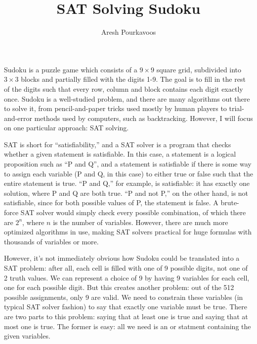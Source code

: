 \documentclass{article}
\begin{document}
\title{SAT Solving Sudoku}
\author{Aresh Pourkavoos}
\maketitle

Sudoku is a puzzle game which consists of a $9 \times 9$ square grid,
subdivided into $3 \times 3$ blocks
and partially filled with the digits 1-9.
The goal is to fill in the rest of the digits such that
every row, column and block contains each digit exactly once.
Sudoku is a well-studied problem,
and there are many algorithms out there to solve it,
from pencil-and-paper tricks used mostly by human players
to trial-and-error methods used by computers, such as backtracking.
However, I will focus on one particular approach: SAT solving.

SAT is short for ``satisfiability,''
and a SAT solver is a program that checks
whether a given statement is satisfiable.
In this case, a statement is a logical proposition
such as ``P and Q'',
and a statement is satisfiable
if there is some way to assign each variable
(P and Q, in this case) to either true or false
such that the entire statement is true.
``P and Q,'' for example, is satisfiable:
it has exactly one solution, where P and Q are both true.
``P and not P,'' on the other hand, is not satisfiable,
since for both possible values of P, the statement is false.
A brute-force SAT solver would simply check every possible combination,
of which there are $2^n$, where $n$ is the number of variables.
However, there are much more optimized algorithms in use,
making SAT solvers practical for huge formulas with thousands of variables or more.

However, it's not immediately obvious
how Sudoku could be translated into a SAT problem:
after all, each cell is filled with one of 9 possible digits,
not one of 2 truth values.
We can represent a choice of 9 by having 9 variables for each cell,
one for each possible digit.
But this creates another problem:
out of the 512 possible assignments, only 9 are valid.
We need to constrain these variables (in typical SAT solver fashion)
to say that exactly one variable must be true.
There are two parts to this problem:
saying that at least one is true
and saying that at most one is true.
The former is easy:
all we need is an or statment containing the given variables.
\end{document}
